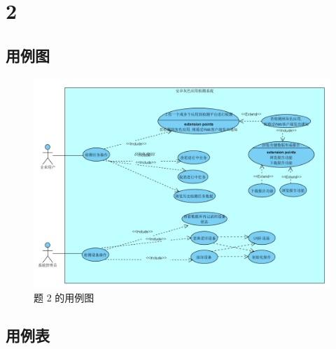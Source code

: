 \documentclass[UTF8]{article}
\begin{document}
\newpage
\section{2}
\subsection{用例图}
\begin{figure}[H]
	\centering
	\includegraphics[width=\linewidth]{2.png}
	\caption{题 2 的用例图}
\end{figure}\par
\subsection{用例表}
\end{document}
